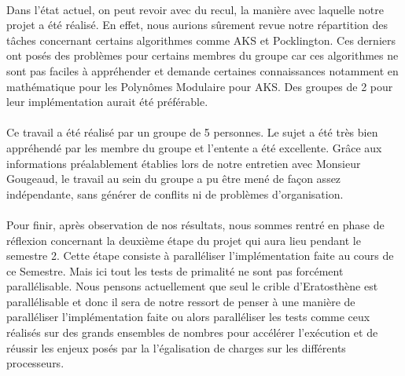 		\paragraph{} Dans l'état actuel, on peut revoir avec du recul, la manière avec laquelle notre projet a été réalisé. En effet, nous aurions sûrement revue notre répartition des tâches concernant certains algorithmes comme AKS et Pocklington. Ces derniers ont posés des problèmes pour certains membres du groupe car ces algorithmes ne sont pas faciles à appréhender et demande certaines connaissances notamment en mathématique pour les Polynômes Modulaire pour AKS. Des groupes de 2 pour leur implémentation aurait été préférable.
		\paragraph{} Ce travail a été réalisé par un groupe de 5 personnes. Le sujet a été très bien appréhendé par les membre du groupe et l'entente a été excellente. Grâce aux informations préalablement établies lors de notre entretien avec Monsieur Gougeaud, le travail au sein du groupe a pu être mené de façon assez indépendante, sans générer de conflits ni de problèmes d'organisation.		
		\paragraph{} Pour finir, après observation de nos résultats, nous sommes rentré en phase de réflexion concernant la deuxième étape du projet qui aura lieu pendant le semestre 2. Cette étape consiste à paralléliser l'implémentation faite au cours de ce Semestre. Mais ici tout les tests de primalité ne sont pas forcément parallélisable. Nous pensons actuellement que seul le crible d'Eratosthène est parallélisable et donc il sera de notre ressort de penser à une manière de paralléliser l'implémentation faite ou alors paralléliser les tests comme ceux réalisés sur des grands ensembles de nombres pour accélérer l'exécution et de réussir les enjeux posés par la l'égalisation de charges sur les différents processeurs.

